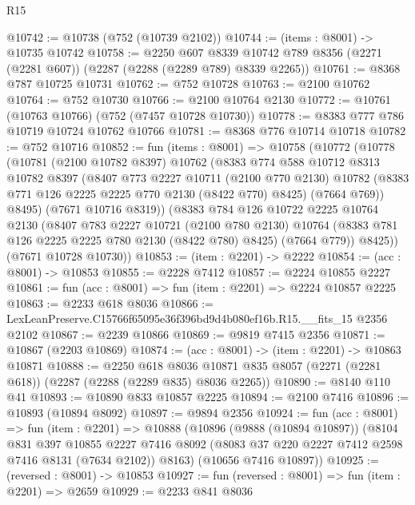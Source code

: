 \begin{lexlean}{R15}
\begin{coremodule}
@10742 := @10738 (@752 (@10739 @2102))
@10744 := (items : @8001) -> @10735 @10742
@10758 := @2250
    @607
    @8339
    @10742
    @789
    @8356
    (@2271 (@2281 @607))
    (@2287 (@2288 (@2289 @789) @8339 @2265))
@10761 := @8368 @787 @10725 @10731
@10762 := @752 @10728
@10763 := @2100 @10762
@10764 := @752 @10730
@10766 := @2100 @10764 @2130
@10772 := @10761 (@10763 @10766) (@752 (@7457 @10728 @10730))
@10778 := @8383 @777 @786 @10719 @10724 @10762 @10766
@10781 := @8368 @776 @10714 @10718
@10782 := @752 @10716
@10852 := fun (items : @8001) =>
  @10758
    (@10772
      (@10778
        (@10781
          (@2100 @10782 @8397)
          @10762
          (@8383
            @774
            @588
            @10712
            @8313
            @10782
            @8397
            (@8407
              @773
              @2227
              @10711
              (@2100 @770 @2130)
              @10782
              (@8383 @771 @126 @2225 @2225 @770 @2130 (@8422 @770) @8425)
              (@7664 @769))
            @8495)
          (@7671 @10716 @8319))
        (@8383
          @784
          @126
          @10722
          @2225
          @10764
          @2130
          (@8407
            @783
            @2227
            @10721
            (@2100 @780 @2130)
            @10764
            (@8383 @781 @126 @2225 @2225 @780 @2130 (@8422 @780) @8425)
            (@7664 @779))
          @8425))
      (@7671 @10728 @10730))
@10853 := (item : @2201) -> @2222
@10854 := (acc : @8001) -> @10853
@10855 := @2228 @7412
@10857 := @2224 @10855 @2227
@10861 := fun (acc : @8001) => fun (item : @2201) => @2224 @10857 @2225
@10863 := @2233 @618 @8036
@10866 := LexLeanPreserve.C15766f65095e36f396bd9d4b080ef16b.R15.__fits_15 @2356 @2102
@10867 := @2239 @10866
@10869 := @9819 @7415 @2356
@10871 := @10867 (@2203 @10869)
@10874 := (acc : @8001) -> (item : @2201) -> @10863 @10871
@10888 := @2250
    @618
    @8036
    @10871
    @835
    @8057
    (@2271 (@2281 @618))
    (@2287 (@2288 (@2289 @835) @8036 @2265))
@10890 := @8140 @110 @41
@10893 := @10890 @833 @10857 @2225
@10894 := @2100 @7416
@10896 := @10893 (@10894 @8092)
@10897 := @9894 @2356
@10924 := fun (acc : @8001) =>
  fun (item : @2201) =>
  @10888
    (@10896
      (@9888 (@10894 @10897))
      (@8104
        @831
        @397
        @10855
        @2227
        @7416
        @8092
        (@8083 @37 @220 @2227 @7412 @2598 @7416 @8131 (@7634 @2102))
        @8163)
      (@10656 @7416 @10897))
@10925 := (reversed : @8001) -> @10853
@10927 := fun (reversed : @8001) => fun (item : @2201) => @2659
@10929 := @2233 @841 @8036

\end{coremodule}
\end{lexlean}
